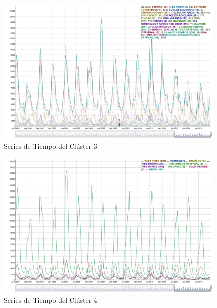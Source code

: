 \documentclass[12pt,oneside]{book}\usepackage[]{graphicx}\usepackage[]{color}
\theoremstyle{definition} %
\begin{document}
\begin{enumerate}
\begin{figure}[H]
\centering
\includegraphics[scale=0.5]{Resultados/Cluster3/1_series_cluster}
\caption{Series de Tiempo del Clúster 3}\label{fig:serie_clust1.3}
\end{figure}

\begin{figure}[H]
\centering
\includegraphics[scale=0.5]{Resultados/Cluster4/1_series_cluster}
\caption{Series de Tiempo del Clúster 4}\label{fig:serie_clust1.4}
\end{figure}





\end{enumerate}







% 
% 
% 
\end{document}
